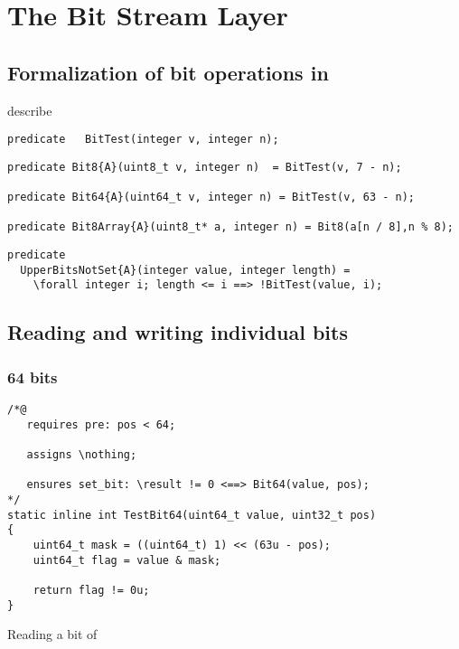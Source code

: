 

\chapter{The Bit Stream Layer}
\label{sec:bitstream}

\section{Formalization of bit operations in \framac}

describe 

\begin{lstlisting}[style=acsl-block]
predicate   BitTest(integer v, integer n);
\end{lstlisting}


\begin{lstlisting}[style=acsl-block]
predicate Bit8{A}(uint8_t v, integer n)  = BitTest(v, 7 - n);

predicate Bit64{A}(uint64_t v, integer n) = BitTest(v, 63 - n);

predicate Bit8Array{A}(uint8_t* a, integer n) = Bit8(a[n / 8],n % 8);
\end{lstlisting}


\begin{lstlisting}[style=acsl-block]
predicate
  UpperBitsNotSet{A}(integer value, integer length) =
    \forall integer i; length <= i ==> !BitTest(value, i);
\end{lstlisting}




\section{Reading and writing individual bits}

\subsection{64 bits}

\begin{listing}[hbt]
\begin{minipage}{0.99\textwidth}
\begin{lstlisting}[style=acsl-block]
/*@
   requires pre: pos < 64;

   assigns \nothing;

   ensures set_bit: \result != 0 <==> Bit64(value, pos);
*/
static inline int TestBit64(uint64_t value, uint32_t pos)
{
    uint64_t mask = ((uint64_t) 1) << (63u - pos);
    uint64_t flag = value & mask;

    return flag != 0u;
}
\end{lstlisting}
\end{minipage}
\caption{\label{lst:TestBit64}Reading a bit of }
\end{listing}


